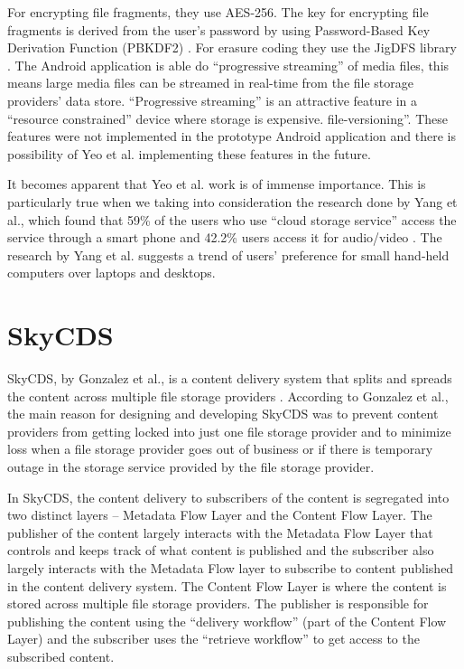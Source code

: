 For encrypting file fragments, they use AES-256. The key for
encrypting file fragments is derived from the user's password by using
Password-Based Key Derivation Function (PBKDF2) \cite{kaliski}. For
erasure coding they use the JigDFS library \cite{jigdfs}. The Android
application is able do ``progressive streaming'' of media files, this
means large media files can be streamed in real-time from the file
storage providers' data store. ``Progressive streaming'' is an
attractive feature in a ``resource constrained'' device where storage
is expensive.
file-versioning''. These features were not implemented in the
prototype Android application and there is possibility of Yeo et
al. implementing these features in the future.

It becomes apparent that Yeo et al. work is of immense
importance. This is particularly true when we taking into
consideration the research done by Yang et al., which found that 59\%
of the users who use ``cloud storage service'' access the service
through a smart phone and 42.2\% users access it for audio/video
\cite{yang}. The research by Yang et al. suggests a trend of users'
preference for small hand-held computers over laptops and desktops.

\section{SkyCDS}\label{2-skycds-sec}

SkyCDS, by Gonzalez et al., is a content delivery system that splits
and spreads the content across multiple file storage providers
\cite{skycds}. According to Gonzalez et al., the main reason for
designing and developing SkyCDS was to prevent content providers from
getting locked into just one file storage provider and to minimize
loss when a file storage provider goes out of business or if there is
temporary outage in the storage service provided by the file storage
provider.

In SkyCDS, the content delivery to subscribers of the content is
segregated into two distinct layers -- Metadata Flow Layer and the
Content Flow Layer. The publisher of the content largely interacts
with the Metadata Flow Layer that controls and keeps track of what
content is published and the subscriber also largely interacts with
the Metadata Flow layer to subscribe to content published in the
content delivery system. The Content Flow Layer is where the content
is stored across multiple file storage providers. The publisher is
responsible for publishing the content using the ``delivery workflow''
(part of the Content Flow Layer) and the subscriber uses the
``retrieve workflow'' to get access to the subscribed content.

